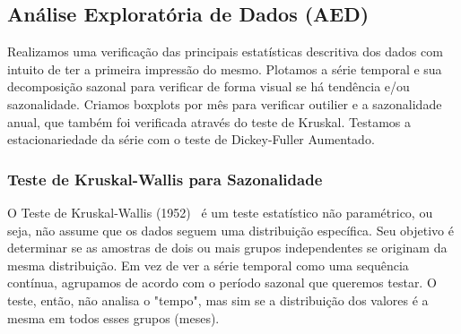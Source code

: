 \documentclass[ 12pt,a4paper ]{article} %
\begin{document}
	
	\subsection{Análise Exploratória de Dados (AED)}
	
	Realizamos uma verificação das principais estatísticas descritiva dos dados com intuito de ter a primeira impressão do mesmo. Plotamos a série temporal e sua decomposição sazonal para verificar de forma visual se há tendência e/ou sazonalidade. Criamos boxplots por mês para verificar  outilier e a sazonalidade anual, que também foi verificada através do teste de Kruskal. Testamos a estacionariedade da série com o teste de Dickey-Fuller Aumentado.
	
	
	\subsubsection{Teste de Kruskal-Wallis para Sazonalidade}
	
	O Teste de Kruskal-Wallis (1952)~\cite{Kruskal} é um teste estatístico não paramétrico, ou seja, não assume que os dados seguem uma distribuição específica. Seu objetivo é determinar se as amostras de dois ou mais grupos independentes se originam da mesma distribuição. Em vez de ver a série temporal como uma sequência contínua, agrupamos de acordo com o período sazonal que queremos testar.
	O teste, então, não analisa o "tempo", mas sim se a distribuição dos valores é a mesma em todos esses grupos (meses).
	
\end{document}
